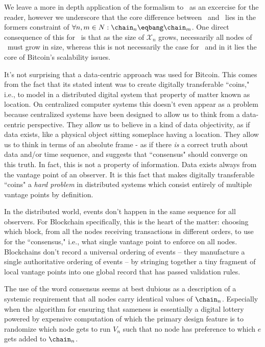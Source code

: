 \documentclass[twocolumn,showpacs,
  nofootinbib,aps,superscriptaddress,
  eqsecnum,prd,notitlepage,showkeys,10pt]{revtex4-1}
\begin{document}
We leave a more in depth application of the formalism to \sgit\ as an excercise for the reader, however we underscore that the core difference between  \sbtc\ and \sgit\ lies in the formers constraint of $\forall n,m \in N: \chain_n\eqbang\chain_m$.  One direct consequence of this for \sbtc\ is that as the size of $\mathcal{X}_n$ grows, necessarily all nodes of \sbtc\ must grow in size, whereas this is not necessarily the case for \sgit\, and in it lies the core of Bitcoin's scalability issues.

It's not surprising that a data-centric approach was used for Bitcoin.  This comes from the fact that its stated intent was to create digitally transferable ``coins," i.e., to model in a distributed digital system that property of matter known as location. On centralized computer systems this doesn't even appear as a problem because centralized systems have been designed to allow us to think from a data-centric perspective.  They allow us to believe in a kind of data objectivity, as if data exists, like a physical object sitting someplace having a location. They allow us to think in terms of an absolute frame - as if there \textit{is} a correct truth about data and/or time sequence, and suggests that ``consensus" should converge on this truth. In fact, this is not a property of information.  Data exists always from the vantage point of an observer.  It is this fact that makes digitally transferable ``coins" a \textit{hard problem} in distributed systems which consist entirely of multiple vantage points by definition.

In the distributed world, events don't happen in the same sequence for all observers.  For Blockchain specifically, this is the heart of the matter: choosing which block, from all the nodes receiving transactions in different orders, to use for the ``consensus," i.e., what single vantage point to enforce on all nodes.  Blockchains don't record a universal ordering of events -- they manufacture a single authoritative ordering of events -- by stringing together a tiny fragment of local vantage points into one global record that has passed validation rules.

The use of the word consensus seems at best dubious as a description of a systemic requirement that all nodes carry identical values of $\chain_n$.  Especially when the algorithm for ensuring that sameness is essentially a digital lottery powered by expensive computation of which the primary design feature is to randomize which node gets to run $V_n$ such that no node has preference to which $e$ gets added to $\chain_n$.
\end{document}
